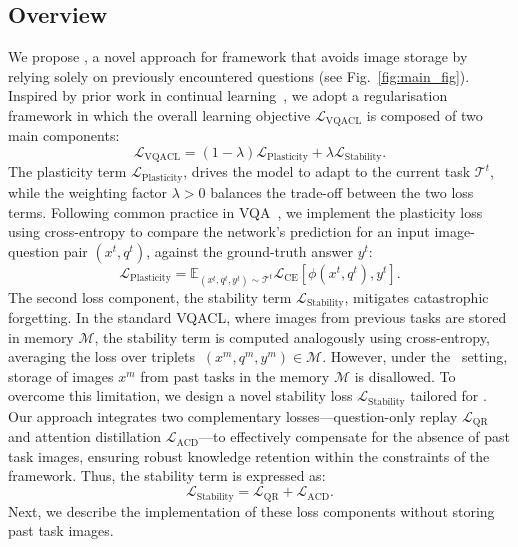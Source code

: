 \subsection{Overview}
We propose \textbf{\qstmethodshort{}}, a novel approach for \setting{} framework that avoids image storage by relying solely on previously encountered questions (see Fig.~\ref{fig:main_fig}). Inspired by prior work in continual learning~\citep{li2017lwf, dhar2019learning}, we adopt a regularisation framework in which the overall learning objective $\mathcal{L}_{\text{VQACL}}$ is composed of two main components:
\begin{equation}
    \label{eq.trad_feat}
    \mathcal{L}_{\text{VQACL}} =  (1 - \lambda) \mathcal{L}_{\text{Plasticity}}+ \lambda\mathcal{L}_{\text{Stability}}.
\end{equation}
The plasticity term \(\mathcal{L}_{\text{Plasticity}}\), drives the model to adapt to the current task $\mathcal{T}^t$, while the weighting factor $\lambda>0$ balances the trade-off between the two loss terms.
Following common practice in VQA~\cite{zhang2023vqacl, Ravi_2023_WACV, Antol_2015_ICCV}, we implement the plasticity loss using cross-entropy to compare the network’s prediction for an input image-question pair \((x^t, q^t)\), against the ground-truth answer \(y^t\):
\begin{equation}
    \label{eq.trad_feat}
    \mathcal{L}_{\text{Plasticity}} = \mathbb{E}_{(x^t, q^t, y^t) \sim \mathcal{T}^t} \mathcal{L}_{\text{CE}}\left[\phi(x^t, q^t), y^t\right] .
\end{equation}
The second loss component, the stability term \(\mathcal{L}_{\text{Stability}}\), mitigates catastrophic forgetting. In the standard VQACL, where images from previous tasks are stored in memory \(\mathcal{M}\), the stability term is computed analogously using cross-entropy, averaging the loss over triplets \(~{(x^m, q^m, y^m) \in \mathcal{M}}\).
However, under the \setting~setting, storage of images \(x^m\) from past tasks in the memory \(\mathcal{M}\) is disallowed. To overcome this limitation, we design a novel stability loss \(\mathcal{L}_{\text{Stability}}\) tailored for \setting. Our approach integrates two complementary losses—question-only replay  $\mathcal{L}_{\text{QR}}$ and attention distillation $\mathcal{L}_{\text{ACD}}$—to effectively compensate for the absence of past task images, ensuring robust knowledge retention within the constraints of the \setting{} framework. Thus, the stability term is expressed as:
\begin{equation}
    \label{eq.trad_feat_stability}
    \mathcal{L}_{\text{Stability}} = \mathcal{L}_{\text{QR}}+\mathcal{L}_{\text{ACD}}.
\end{equation} 
Next, we describe the implementation of these loss components without storing past task images.

